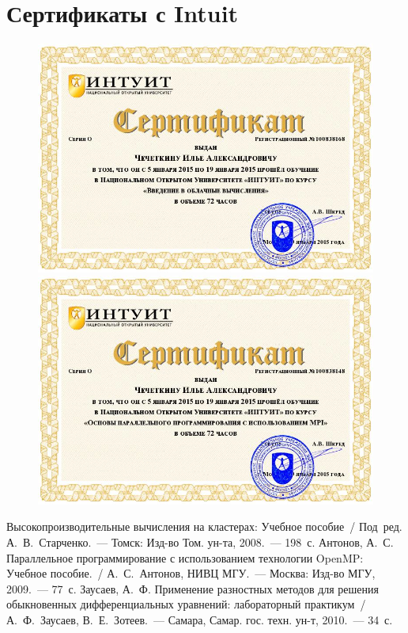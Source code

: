 \documentclass[14pt,final,titlepage,pscyr]{hedwork}
\begin{document}
\section{Сертификаты с Intuit}
\begin{figure}[h!]
  \centering
  \includegraphics[width=.85\textwidth]{cloud}\\[2em]
  \includegraphics[width=.85\textwidth]{mpi}
\end{figure}

\newpage

\renewcommand{\bibname}{Список используемой литературы}
\begin{thebibliography}{10}
	 Высокопроизводительные вычисления на кластерах:
	  Учебное пособие~/ Под~ред. А.~В.~Старченко.~---
	  Томск: Изд-во Том. ун-та, 2008.~--- 198~с. 
	 Антонов, А.~С. Параллельное программирование с использованием
	  технологии OpenMP: Учебное пособие.~/ А.~С.~Антонов, НИВЦ МГУ.~---
	  Москва: Изд-во МГУ, 2009.~--- 77~с.
	 Заусаев, А.~Ф. Применение разностных методов для решения
    обыкновенных дифференциальных уравнений: лабораторный практикум~/
    А.~Ф.~Заусаев, В.~Е.~Зотеев.~---
    Самара, Самар. гос. техн. ун-т, 2010.~--- 34~с.
\end{thebibliography}

\newpage
\end{document}
